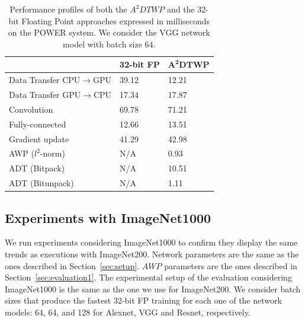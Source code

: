 \begin{table}
    \caption{Performance profiles of both the $A^2DTWP$ and the 32-bit Floating 
    Point approaches expressed in milliseconds on the POWER system. 
    We consider the VGG network model with batch size 64.} 
    \vspace{-0.35cm}
    \centering
    \begin{tabular}{|P{4.2cm}|P{1.5cm}|P{1.5cm}|}
    \hline
    & \textbf{32-bit FP} & $\mathbf{A^2DTWP}$ \\
    \hline
    Data Transfer CPU$\rightarrow$GPU& 39.12 & 12.21 \\
    \hline
    Data Transfer GPU$\rightarrow$CPU& 17.34 & 17.87 \\
    \hline
    Convolution & 69.78 & 71.21\\
    \hline
    Fully-connected & 12.66 & 13.51 \\
    \hline
    Gradient update & 41.29 & 42.98\\
    \hline
    AWP ($l^2$-norm) & N/A & 0.93 \\
    \hline
    ADT (Bitpack) & N/A & 10.51 \\
    \hline
    ADT (Bitunpack) & N/A & 1.11 \\
    \hline
    \end{tabular}
    \label{table:performance_p9}
\end{table}

\subsection{Experiments with ImageNet1000}
\label{sec:ImageNet1000}
We run experiments considering ImageNet1000 to confirm they display the same trends as executions with ImageNet200. 
Network parameters are the same as the ones described in Section~\ref{sec:setup}.
$AWP$ parameters are the ones described in Section~\ref{sec:evaluation1}.
The experimental setup of the evaluation considering ImageNet1000 is the same as the one we use for ImageNet200.
We consider batch sizes that produce the fastest 32-bit FP training for each one of the network models: 64, 64, and 128 for Alexnet, VGG and Resnet, respectively.


